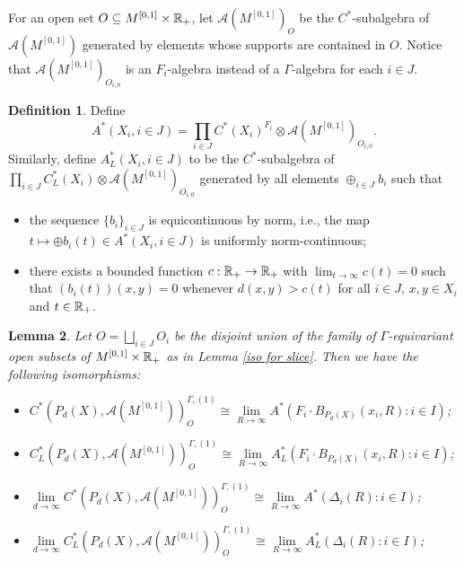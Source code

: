 \documentclass[11pt]{article}
\theoremstyle{definition}
\newtheorem{Def}{Definition}[section]
\theoremstyle{plain}
\newtheorem{Lem}[Def]{Lemma}
\def\A{\mathcal A}\def\C{\mathcal C}\def\B{\mathcal B}\def\E{\mathcal E}\def\O{\mathcal O}\def\h{\mathfrak h}\def\K{\mathcal K}\def\F{\mathcal F}\def\P{\mathcal P}\def\L{\mathcal L}\def\R{\mathcal R}\def\Q{\mathcal Q}\def\H{\mathcal H}\def\S{\mathcal S}\def\N{\mathcal N}\def\U{\mathcal U}\def\V{\mathcal V}
\def\ox{\otimes}
\def\ox{\otimes}
\def\Ga{\Gamma}
\begin{document}
For an open set $O\subseteq M^{[0,1]}\times\mathbb R_+$, let $\A(M^{[0,1]})_{O}$ be the $C^*$-subalgebra of $\A(M^{[0,1]})$ generated by elements whose supports are contained in $O$. Notice that $\A(M^{[0,1]})_{O_{i,0}}$ is an $F_i$-algebra instead of a $\Ga$-algebra for each $i\in J$.

\begin{Def}
Define
\[A^*(X_i,i\in J)=\prod_{i\in J} C^*(X_i)^{F_i}\ox\A(M^{[0,1]})_{O_{i,0}}.\]
Similarly, define $A_L^*(X_i,i\in J)$ to be the $C^*$-subalgebra of $\prod_{i\in J}C^*_L(X_i)\ox\A(M^{[0,1]})_{O_{i,0}}$ generated by all elements $\oplus_{i\in J}b_i$ such that\begin{itemize}
\item[(1)] the sequence $\{b_i\}_{i\in J}$ is equicontinuous by norm, i.e., the map $t\mapsto\oplus b_i(t)\in A^*(X_i,i\in J)$ is uniformly norm-continuous;
\item[(2)] there exists a bounded function $c:\mathbb R_+\to\mathbb R_+$ with $\lim_{t\to\infty}c(t)=0$ such that $(b_i(t))(x,y)=0$ whenever $d(x,y)>c(t)$ for all $i\in J$, $x,y\in X_i$ and $t\in\mathbb R_+$.
\end{itemize}\end{Def}

\begin{Lem}\label{to simplex}
Let $O=\bigsqcup_{i\in J}O_i$ be the disjoint union of the family of $\Ga$-equivariant open subsets of $M^{[0,1]}\times\mathbb R_+$ as in Lemma \ref{iso for slice}. Then we have the following isomorphisms:\begin{itemize}
\item[(1)] $C^*(P_d(X),\A(M^{[0,1]}))^{\Ga,(1)}_O\cong\lim\limits_{R\to\infty} A^*(F_i\cdot B_{P_d(X)}(x_i,R):i\in I)$;
\item[(2)] $C^*_L(P_d(X),\A(M^{[0,1]}))^{\Ga,(1)}_O\cong\lim\limits_{R\to\infty} A^*_L(F_i\cdot B_{P_d(X)}(x_i,R):i\in I)$;
\item[(3)] $\lim\limits_{d\to\infty}C^*(P_d(X),\A(M^{[0,1]}))^{\Ga,(1)}_O\cong\lim\limits_{R\to\infty} A^*(\Delta_i(R):i\in I)$;
\item[(4)] $\lim\limits_{d\to\infty}C^*_L(P_d(X),\A(M^{[0,1]}))^{\Ga,(1)}_O\cong\lim\limits_{R\to\infty} A^*_L(\Delta_i(R):i\in I)$;
\end{itemize}\end{Lem}
\end{document}
